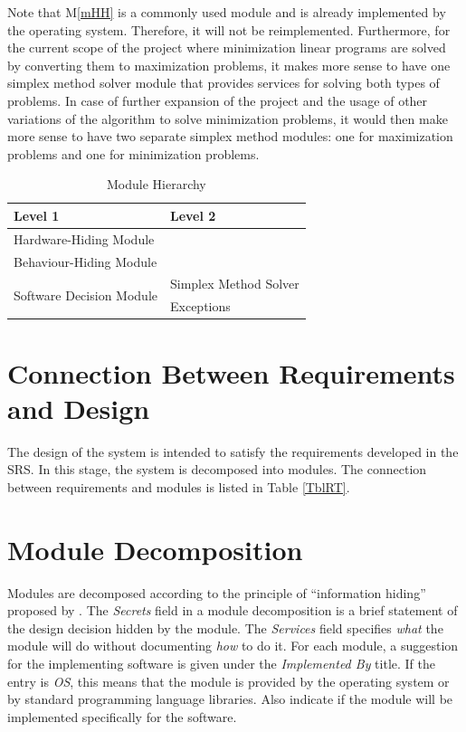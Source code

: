 \documentclass[12pt, titlepage]{article}
\newcommand{\mref}[1]{M\ref{#1}}
\begin{document}
Note that \mref{mHH} is a commonly used module and is already implemented by 
the operating system. Therefore, it will not be reimplemented. Furthermore, for 
the current scope of the project where minimization linear programs are solved 
by converting them to maximization problems, it makes more sense to have one 
simplex method solver module that provides services for solving both types of 
problems. In case of further expansion of the project and the usage of other 
variations of the algorithm to solve minimization problems, it would then make 
more sense to have two separate simplex method modules: one for maximization 
problems and one for minimization problems.

\begin{table}[h!]
\centering
\begin{tabular}{p{} p{}}
\toprule
\textbf{Level 1} & \textbf{Level 2}\\
\midrule

{Hardware-Hiding Module} & ~ \\
\midrule

{Behaviour-Hiding Module} & ~ \\
\midrule

\multirow{3}{0.3\textwidth}{Software Decision Module}
& Simplex Method Solver\\
& Exceptions\\
\bottomrule

\end{tabular}
\caption{Module Hierarchy}
\label{TblMH}
\end{table}

\section{Connection Between Requirements and Design} \label{SecConnection}

The design of the system is intended to satisfy the requirements developed in
the SRS. In this stage, the system is decomposed into modules. The connection
between requirements and modules is listed in Table \ref{TblRT}.

\section{Module Decomposition} \label{SecMD}

Modules are decomposed according to the principle of ``information hiding''
proposed by \citet{ParnasEtAl1984}. The \emph{Secrets} field in a module
decomposition is a brief statement of the design decision hidden by the
module. The \emph{Services} field specifies \emph{what} the module will do
without documenting \emph{how} to do it. For each module, a suggestion for the
implementing software is given under the \emph{Implemented By} title. If the
entry is \emph{OS}, this means that the module is provided by the operating
system or by standard programming language libraries.  Also indicate if the
module will be implemented specifically for the software.
\end{document}
